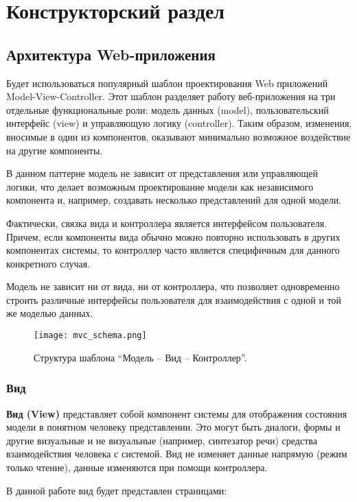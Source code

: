 \chapter{Конструкторский раздел}

\section{Архитектура Web-приложения}
Будет использоваться популярный шаблон проектирования Web приложений Model-View-Controller. Этот шаблон разделяет работу веб-приложения на три отдельные функциональные роли: модель данных (model), пользовательский интерфейс (view) и управляющую логику (controller). Таким образом, изменения, вносимые в один из компонентов, оказывают минимально возможное воздействие на другие компоненты.

В данном паттерне модель не зависит от представления или управляющей логики, что делает возможным проектирование модели как независимого компонента и, например, создавать несколько представлений для одной модели.

Фактически, связка вида и контроллера является интерфейсом пользователя. Причем, если компоненты вида обычно можно повторно использовать в других компонентах системы, то контроллер часто является специфичным для данного конкретного случая.

Модель не зависит ни от вида, ни от контроллера, что позволяет одновременно строить различные интерфейсы пользователя для взаимодействия с одной и той же моделью данных.

\begin{figure}[h]
  \centering
  \texttt{[image: mvc\_schema.png]}
  \caption{ Структура шаблона “Модель – Вид – Контроллер”.}
\end{figure}

\subsection{Вид}

\textbf{Вид (View)} представляет собой компонент системы для отображения состояния модели в понятном человеку представлении. Это могут быть диалоги, формы и другие визуальные и не визуальные (например, синтезатор речи) средства взаимодействия человека с системой. Вид не изменяет данные напрямую (режим только чтение), данные изменяются при помощи контроллера.

В данной работе вид будет представлен страницами:


